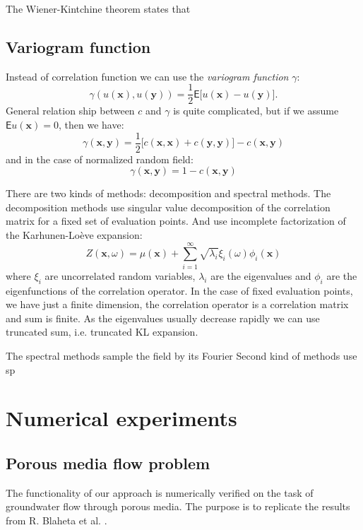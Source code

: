 \documentclass{article}
\def\vc#1{\mathbf{\boldsymbol{#1}}}     %
\def \E{{\mathsf E}}
\def\todo#1{{\color{red}TODO: #1}}
\begin{document}
The Wiener-Kintchine theorem states that
\cite{}

\subsection{Variogram function}
Instead of correlation function we can use the \emph{variogram function} $\gamma$:
\[
    \gamma(u(\vc x), u(\vc y)) = \frac12 \E\big[u(\vc x) - u(\vc y)\big].
\]
General relation ship between $c$ and $\gamma$ is quite complicated, but if we assume $\E u(\vc x) = 0$, then
we have:
\[
    \gamma(\vc x, \vc y) = \frac12 \big[ c(\vc x, \vc x) + c(\vc y, \vc y)\big] - c(\vc x, \vc y)
\]
and in the case of normalized random field:
\[
    \gamma(\vc x, \vc y) = 1 - c(\vc x, \vc y)
\]


There are two kinds of methods: decomposition and spectral methods. The decomposition methods use singular value decomposition of the correlation matrix for a fixed set of evaluation points. And use incomplete factorization of the Karhunen-Lo\`eve expansion:
\[
    Z(\vc x, \omega) = \mu(\vc x) +  \sum_{i = 1}^\infty \sqrt{\lambda_i} \xi_i(\omega) \phi_i(\vc x)
\]
where  $\xi_i$ are uncorrelated random variables, $\lambda_i$ are the eigenvalues and  $\phi_i$ are 
the eigenfunctions of the correlation operator. In the case of fixed evaluation points, we have just a finite
dimension, the correlation operator is a correlation matrix and sum is finite. As the eigenvalues usually decrease
rapidly we can use truncated sum, i.e. truncated KL expansion.

The spectral methods sample the field by its Fourier Second kind of methods use sp

\section{Numerical experiments}

\subsection{Porous media flow problem}
The functionality of our approach is numerically verified on the task of groundwater flow through porous media. The purpose is to replicate the results from R. Blaheta et al. \cite{Blaheta20160413}.
\end{document}
